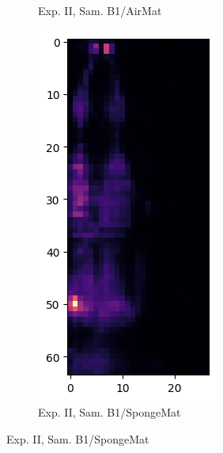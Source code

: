 \documentclass[10pt]{article}
\begin{document}
\begin{figure}[!h]
\begin{subfigure}{0.3\textwidth}
      \caption{Exp. II, Sam. B1/AirMat}
    \end{subfigure}
    \hfill
    \begin{subfigure}{0.3\textwidth}
      \centering
      \includegraphics[width=\linewidth]{./EII_SpongeMat_B1.png}
      \caption{Exp. II, Sam. B1/SpongeMat}
    \end{subfigure}
  \end{figure}
\end{document}
